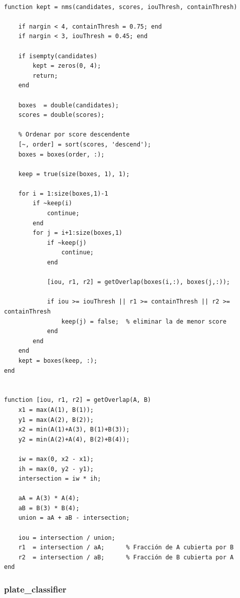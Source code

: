 \begin{verbatim}

function kept = nms(candidates, scores, iouThresh, containThresh)

    if nargin < 4, containThresh = 0.75; end
    if nargin < 3, iouThresh = 0.45; end

    if isempty(candidates)
        kept = zeros(0, 4);
        return;
    end

    boxes  = double(candidates);
    scores = double(scores);

    % Ordenar por score descendente
    [~, order] = sort(scores, 'descend');
    boxes = boxes(order, :);

    keep = true(size(boxes, 1), 1);

    for i = 1:size(boxes,1)-1
        if ~keep(i)
            continue; 
        end
        for j = i+1:size(boxes,1)
            if ~keep(j)
                continue; 
            end

            [iou, r1, r2] = getOverlap(boxes(i,:), boxes(j,:));

            if iou >= iouThresh || r1 >= containThresh || r2 >= containThresh
                keep(j) = false;  % eliminar la de menor score
            end
        end
    end
    kept = boxes(keep, :);
end


function [iou, r1, r2] = getOverlap(A, B)
    x1 = max(A(1), B(1));
    y1 = max(A(2), B(2));
    x2 = min(A(1)+A(3), B(1)+B(3));
    y2 = min(A(2)+A(4), B(2)+B(4));

    iw = max(0, x2 - x1);
    ih = max(0, y2 - y1);
    intersection = iw * ih;

    aA = A(3) * A(4);
    aB = B(3) * B(4);
    union = aA + aB - intersection;

    iou = intersection / union; 
    r1  = intersection / aA;      % Fracción de A cubierta por B
    r2  = intersection / aB;      % Fracción de B cubierta por A
end

\end{verbatim}

\subsubsection{plate\_classifier}

